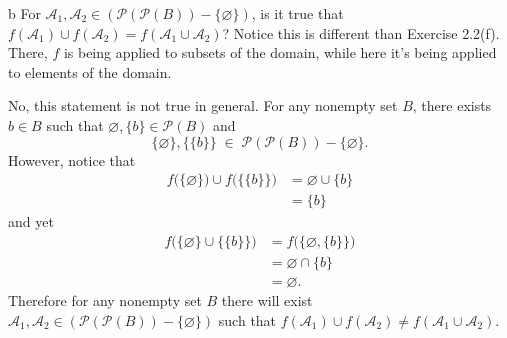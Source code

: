 \documentclass[11pt]{article}
\begin{document}
\begin{p}{b}
  For $\mathcal{A}_1, \mathcal{A}_2 \in (\mathscr{P}(\mathscr{P}(B)) -
  \{\varnothing\})$, is it true that $f(\mathcal{A}_1) \cup f(\mathcal{A}_2) =
  f(\mathcal{A}_1 \cup \mathcal{A}_2)$? Notice this is different than Exercise
  2.2(f). There, $f$ is being applied to subsets of the domain, while here it's
  being applied to elements of the domain.
\end{p}

\begin{solution}
  No, this statement is not true in general. For any nonempty set $B$, there
  exists $b \in B$ such that $\varnothing, \{b\} \in \mathscr{P}(B)$ and
  $$\{\varnothing\}, \{\{b\}\} \;\in\; \mathscr{P}(\mathscr{P}(B)) -
  \{\varnothing\}.$$
  However, notice that
  \begin{align*}
    f\big(\{\varnothing\}\big) \cup f\big(\{\{b\}\}\big)
      &= \varnothing \cup \{b\} \\
      &= \{b\}
  \end{align*}
  and yet
  \begin{align*}
    f\big(\{\varnothing\} \cup \{\{b\}\}\big)
      &= f\big(\{\varnothing, \{b\}\}\big) \\
      &= \varnothing \cap \{b\} \\
      &= \varnothing.
  \end{align*}
  Therefore for any nonempty set $B$ there will exist $\mathcal{A}_1,
  \mathcal{A}_2 \in (\mathscr{P}(\mathscr{P}(B)) -
  \{\varnothing\})$ such that $f(\mathcal{A}_1) \cup f(\mathcal{A}_2) \neq
  f(\mathcal{A}_1 \cup \mathcal{A}_2)$.
\end{solution}
\end{document}
